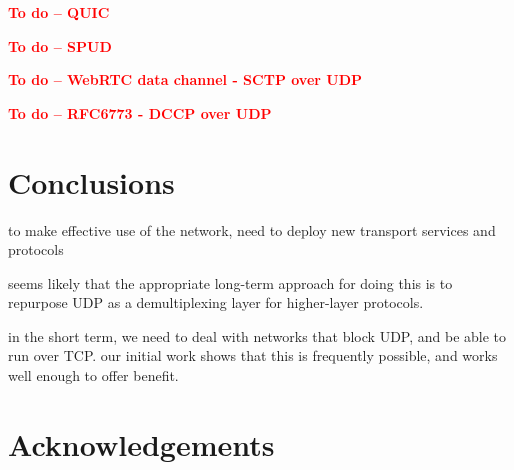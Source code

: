 \documentclass{sig-alternate-05-2015}
\newcommand{\todo}[1]{\textbf{\textcolor{red}{To do -- #1}}}
\begin{document}
\todo{QUIC}

\todo{SPUD}

\todo{WebRTC data channel - SCTP over UDP}

\todo{RFC6773 - DCCP over UDP}


\section{Conclusions}
\label{sec:conclusions}

to make effective use of the network, need to deploy new transport services
and protocols

seems likely that the appropriate long-term approach for doing this is to
repurpose UDP as a demultiplexing layer for higher-layer protocols. 

in the short term, we need to deal with networks that block UDP, and be
able to run over TCP.
our initial work shows that this is frequently possible, and works well
enough to offer benefit.

\section{Acknowledgements}




\end{document}
